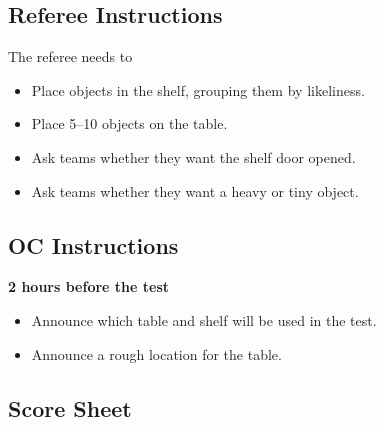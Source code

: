 \newpage

\subsection*{Referee Instructions}
The referee needs to
\begin{itemize}
	\item Place objects in the shelf, grouping them by likeliness.
	\item Place 5--10 objects on the table.
	\item Ask teams whether they want the shelf door opened.
	\item Ask teams whether they want a heavy or tiny object.
\end{itemize}

\subsection*{OC Instructions}

\textbf{2 hours before the test}
\begin{itemize}
	\item Announce which table and shelf will be used in the test.
	\item Announce a rough location for the table.
\end{itemize}




\subsection*{Score Sheet}


